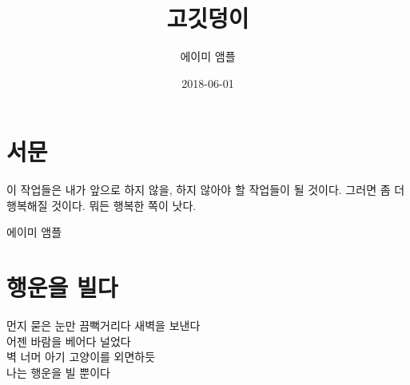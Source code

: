 \documentclass[12pt, b6paper, openany]{memoir}
\author{에이미 앰플}
\title{고깃덩이}
\date{2018-06-01}
\newenvironment{lyric}{%
	\setlength{\parindent}{0pt}
}{}
\newenvironment{article}{}{}
\begin{document}
	\frontmatter
		\begin{titlingpage}
		\maketitle
		\end{titlingpage}
		\tableofcontents

	\mainmatter
\begin{article}
\hypertarget{uxc11cuxbb38}{%

\chapter{서문}\label{uxc11cuxbb38}}



이 작업들은 내가 앞으로 하지 않을, 하지 않아야 할 작업들이 될 것이다. 그러면 좀 더 행복해질 것이다. 뭐든 행복한 쪽이 낫다.



에이미 앰플


\end{article}
\begin{lyric}
\hypertarget{uxd589uxc6b4uxc744-uxbe4cuxb2e4}{%

\chapter{행운을 빌다}\label{uxd589uxc6b4uxc744-uxbe4cuxb2e4}}



먼지 묻은 눈만 끔뻑거리다 새벽을 보낸다\\

어젠 바람을 베어다 널었다\\

벽 너머 아기 고양이를 외면하듯\\

나는 행운을 빌 뿐이다


\end{lyric}
\end{document}
